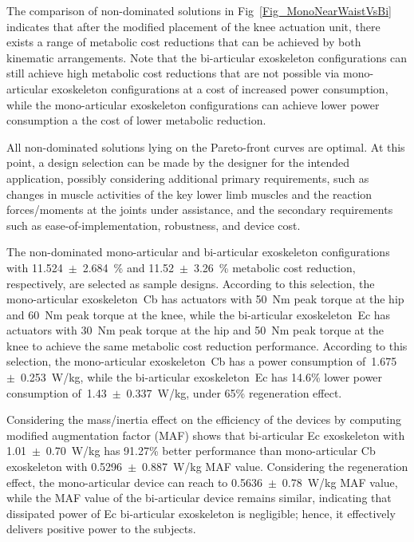 \documentclass[10pt,letterpaper]{article}
\begin{document}
The comparison of non-dominated solutions in Fig~\ref{Fig_MonoNearWaistVsBi} indicates that after the modified placement of the knee actuation unit, there exists a range of metabolic cost reductions that can be achieved by both kinematic arrangements. Note that the bi-articular exoskeleton configurations can still achieve high metabolic cost reductions that are not possible via mono-articular exoskeleton configurations at a cost of increased power consumption, while the mono-articular exoskeleton configurations can achieve lower power consumption a the cost of lower metabolic reduction.

All non-dominated solutions lying on the Pareto-front curves are optimal. At this point, a design selection can be made by the designer for the intended application, possibly considering additional primary requirements, such as changes in muscle activities of the key lower limb muscles and the reaction forces/moments at the joints under assistance, and the secondary requirements such as ease-of-implementation, robustness, and device cost.

The non-dominated mono-articular and bi-articular exoskeleton configurations with 11.524~$\pm$~2.684~\% and 11.52~$\pm$~3.26~\% metabolic cost reduction, respectively, are selected as sample designs. According to this selection, the mono-articular exoskeleton~Cb has actuators with 50~Nm peak torque at the hip and 60~Nm peak torque at the knee, while the bi-articular exoskeleton~Ec has actuators with 30~Nm peak torque at the hip and 50~Nm peak torque at the knee to achieve the same metabolic cost reduction performance. According to this selection, the mono-articular exoskeleton~Cb has a power consumption of~1.675~$\pm$~0.253~W/kg, while the bi-articular exoskeleton~Ec has 14.6\% lower power consumption of~1.43~$\pm$~0.337~W/kg, under 65\% regeneration effect.


Considering the mass/inertia effect on the efficiency of the devices by computing modified augmentation factor (MAF) shows that bi-articular Ec exoskeleton with 1.01~$\pm$~0.70~W/kg has 91.27\% better performance than mono-articular Cb exoskeleton with 0.5296~$\pm$~0.887~W/kg MAF value. Considering the regeneration effect, the mono-articular device can reach to 0.5636~$\pm$~0.78~W/kg MAF value, while the MAF value of the bi-articular device remains similar, indicating that dissipated power of Ec bi-articular exoskeleton is negligible; hence, it effectively delivers positive power to the subjects.
\end{document}

